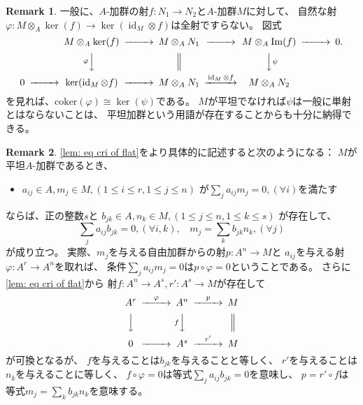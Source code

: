 \documentclass[uplatex]{jsarticle}
\theoremstyle{definition}
\newtheorem{rem}[rem]{Remark}
\DeclareMathOperator{\id}{\mathrm{id}}
\DeclareMathOperator{\im}{\mathrm{Im}}
\newcommand{\coker}{\mathrm{coker}}
\begin{document}
\begin{rem}\label{rem: flat remark}
  一般に、\(A\)-加群の射\(f:N_1\to N_2\)と\(A\)-加群\(M\)に対して、
  自然な射\(\varphi : M\otimes_A \ker(f) \to \ker(\id_M\otimes f)\)は全射ですらない。
  図式
  \[
  \begin{CD}
    @. M\otimes_A \ker(f) @>>> M\otimes_A N_1 @>>> M\otimes_A \im(f) @>>> 0. \\
    @. @V\varphi VV @| @VV\psi V @. \\
    0 @>>> \ker(\id_M\otimes f) @>>> M\otimes_A N_1 @> \id_M \otimes f >> M\otimes_A N_2 @.
  \end{CD}
  \]
  を見れば、\(\coker(\varphi) \cong \ker(\psi)\)である。
  \(M\)が平坦でなければ\(\psi\)は一般に単射とはならないことは、
  平坦加群という用語が存在することからも十分に納得できる。
\end{rem}



\begin{rem}
  \autoref{lem: eq cri of flat}をより具体的に記述すると次のようになる：
  \(M\)が平坦\(A\)-加群であるとき、
  \begin{itemize}
    \item[ \ ] \(a_{ij}\in A, m_j\in M , (1 \leq i \leq r, 1 \leq j \leq n)\)
    が\(\sum _ja_{ij}m_j = 0, (\forall i)\)を満たす
  \end{itemize}
  ならば、正の整数\(s\)と
  \(b_{jk}\in A, n_k\in M, (1 \leq j \leq n, 1 \leq k \leq s)\)
  が存在して、
  \[
  \sum _j a_{ij}b_{jk}=0 , (\forall i,k), \ \ \ \
  m_j = \sum_k b_{jk}n_k , (\forall j)
  \]
  が成り立つ。
  実際、\(m_j\)を与える自由加群からの射\(p:A^n\to M\)と
  \(a_{ij}\)を与える射\(\varphi:A^r\to A^n\)を取れば、
  条件\(\sum _ja_{ij}m_j = 0\)は\(p\circ \varphi = 0\)ということである。
  さらに\autoref{lem: eq cri of flat}から
  射\(f:A^n \to A^s, r':A^s \to M\)が存在して
  \[
  \begin{CD}
    A^r @>\varphi >> A^n @>p>> M \\
    @VVV @VfVV @| \\
    0 @>>> A^s @>r'>> M
  \end{CD}
  \]
  が可換となるが、
  \(f\)を与えることは\(b_{jk}\)を与えることと等しく、
  \(r'\)を与えることは\(n_k\)を与えることに等しく、
  \(f\circ \varphi = 0\)は等式\(\sum _j a_{ij}b_{jk}=0\)を意味し、
  \(p=r'\circ f\)は等式\(m_j = \sum_k b_{jk}n_k\)を意味する。
\end{rem}
\end{document}
